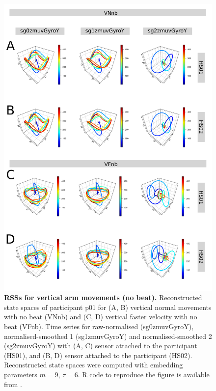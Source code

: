 \begin{figure}[!h]
\centering
\includegraphics[height=0.8\textheight]{rss_Vnb_w500}
\caption{
	{\bf RSSs for vertical arm movements (no beat).}
	Reconstructed state spaces of participant p01 for 
	(A, B) vertical normal movements with no beat (VNnb) and 
	(C, D) vertical faster velocity with no beat (VFnb).
	Time series for raw-normalised (sg0zmuvGyroY), 
	normalised-smoothed 1 (sg1zmuvGyroY) and 
	normalised-smoothed 2 (sg2zmuvGyroY) with
	(A, C) sensor attached to the participant (HS01), and
	(B, D) sensor attached to the participant (HS02).	
	Reconstructed state spaces were computed with 
	embedding parameters $m=9$, $\tau=6$.
	R code to reproduce the figure is available from \cite{hwum2018}.
        }
     \label{fig:rss_Vnb_w500}
\end{figure}

